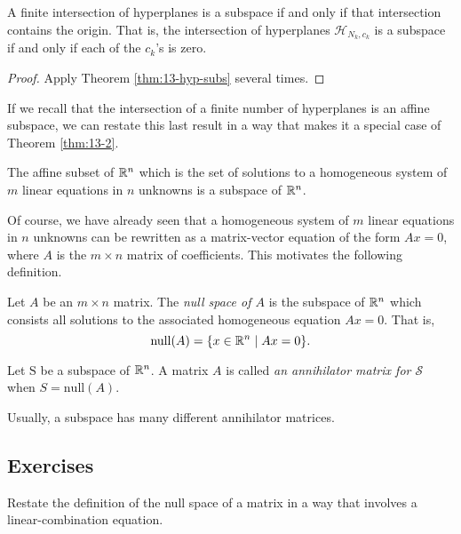 \documentclass[elementsmain.tex]{subfiles}
\begin{document}
\begin{theorem} A finite intersection of hyperplanes is a subspace if and only if that intersection contains the origin. That is, the intersection of hyperplanes $\mathcal{H}_{N_k,c_k}$ is a subspace if and only if each of the $c_k$'s is zero.
\end{theorem}

\begin{proof}
Apply Theorem \ref{thm:13-hyp-subs} several times.
\end{proof}


If we recall that the intersection of a finite number of hyperplanes is an affine subspace, we can restate this last result in a way that makes it a special case of Theorem \ref{thm:13-2}.

\begin{corollary} The affine subset of $\mathbb{R}^n$ which is the set of solutions to a homogeneous system of $m$ linear equations in $n$ unknowns is a subspace of $\mathbb{R}^n$.
\end{corollary}

Of course, we have already seen that a homogeneous system of $m$ linear equations in $n$ unknowns can be rewritten as a matrix-vector equation of the form $Ax=0$, where $A$ is the $m\times n$ matrix of coefficients. This motivates the following definition.

\begin{definition}
Let $A$ be an $m\times n$ matrix. The \emph{null space of $A$} is the subspace of $\mathbb{R}^n$ which consists all solutions to the associated homogeneous equation $Ax=0$. That is, 
\[
\mathrm{null}(A) = \{ x \in \mathbb{R}^n \mid Ax=0 \}.
\]
\end{definition}


\begin{definition}
Let $\mathrm{S}$ be a subspace of $\mathbb{R}^n$. A matrix $A$ is called \emph{an annihilator matrix for $\mathcal{S}$} when $S=\mathrm{null}(A)$.
\end{definition}

Usually, a subspace has many different annihilator matrices.


\clearpage

\subsection*{Exercises}

\begin{exercise} Restate the definition of the null space of a matrix in a way that involves a linear-combination equation.
\end{exercise}
\end{document}
